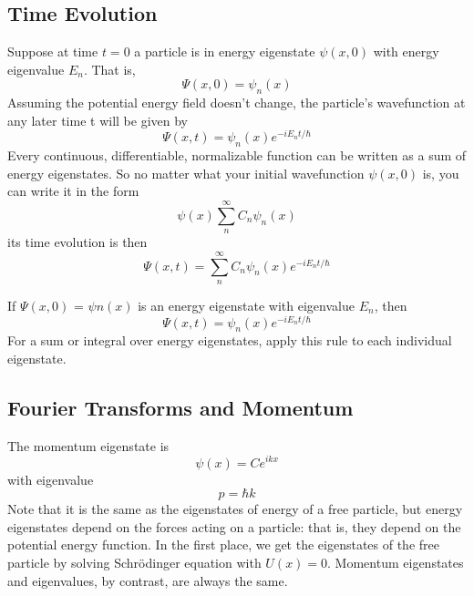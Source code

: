 \documentclass[../../../main.tex]{subfiles}
\begin{document}
\subsection{Time Evolution}
Suppose at time $t = 0$ a particle is in energy eigenstate $\psi (x,0)$ with energy eigenvalue $E_n$.
That is,
\begin{equation*}
    \Psi (x,0)=\psi_n(x)
\end{equation*}
Assuming the potential energy field doesn't change, the particle's wavefunction at any later
time t will be given by
\begin{equation*}
    \Psi(x,t)=\psi_n (x)e^{-iE_n t/\hbar}
\end{equation*}
Every continuous, differentiable, normalizable function can be written as a sum of energy eigenstates. So no matter what your initial wavefunction $\psi (x,0)$ is, you can write it in the
form 
\begin{equation*}
    \psi (x)\sum_{n}^{\infty}C_n \psi_n(x)
\end{equation*}
its time evolution is then 
\begin{equation*}
    \Psi(x,t)=\sum_{n}^{\infty}C_n\psi_n (x)e^{-iE_n t/\hbar}
\end{equation*}

If $\Psi (x,0)$ = $\psi n(x)$ is an energy eigenstate with eigenvalue $E_n$, then
\begin{equation*}
    \Psi(x,t)=\psi_n (x)e^{-iE_n t/\hbar}
\end{equation*}
For a sum or integral over energy eigenstates, apply this rule to each individual eigenstate.

\subsection{Fourier Transforms and Momentum}
The momentum eigenstate is 
\begin{equation*}
    \psi(x) = Ce^{ikx}
\end{equation*}
with eigenvalue
\begin{equation*}
    p = \hbar k
\end{equation*}
Note that it is the same as the eigenstates of energy of a free particle, but energy eigenstates depend on the forces acting on a particle: that is, they depend on the potential energy function. In the first place, we get the eigenstates of the free particle by solving Schrödinger equation with $U(x) = 0 $. Momentum eigenstates and eigenvalues, by contrast, are always the same.
\end{document}
